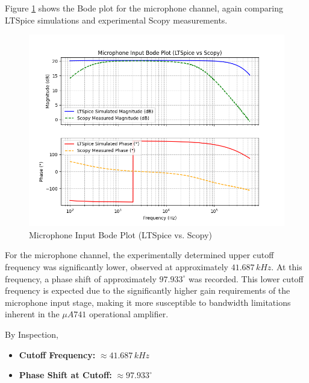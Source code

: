 \documentclass[12pt]{article}
\begin{document}
Figure \ref{fig:mic_bode} shows the Bode plot for the microphone channel, again comparing LTSpice simulations and experimental Scopy measurements.

\begin{figure}[H]
	\centering
	\includegraphics[width=1.0\textwidth]{dp_mic}
	\caption{Microphone Input Bode Plot (LTSpice vs. Scopy)}
	\label{fig:mic_bode}
\end{figure}

For the microphone channel, the experimentally determined upper cutoff frequency
was significantly lower, observed at approximately $41.687\,kHz$. At this
frequency, a phase shift of approximately $97.933^\circ$ was recorded. This lower cutoff frequency is expected due to the significantly higher gain requirements of the microphone input stage, making it more susceptible to bandwidth limitations inherent in the $\mu A741$ operational amplifier.

By Inspection,
\begin{itemize}
	\item \textbf{Cutoff Frequency:} $\approx 41.687\,kHz$
	\item \textbf{Phase Shift at Cutoff:} $\approx 97.933^\circ$
\end{itemize}
\end{document}

